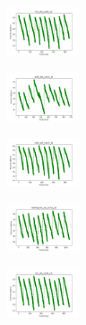 \begin{figure}[H]
    \centering
    \begin{subfigure}
        \centering
        \includegraphics[width=0.234\textwidth]{img/bmb/iris_set_const_10_949004259_cost.png}
    \end{subfigure}
    \hfill
    \begin{subfigure}
        \centering
        \includegraphics[width=0.234\textwidth]{img/bmb/ecoli_set_const_10_949004259_cost.png}
    \end{subfigure}
    \hfill
    \begin{subfigure}
        \centering
        \includegraphics[width=0.234\textwidth]{img/bmb/rand_set_const_10_949004259_cost.png}
    \end{subfigure}
    \hfill
    \begin{subfigure}
        \centering
        \includegraphics[width=0.234\textwidth]{img/bmb/newthyroid_set_const_10_949004259_cost.png}
    \end{subfigure}
    \hfill
    \begin{subfigure}
        \centering
        \includegraphics[width=0.234\textwidth]{img/bmb/iris_set_const_10_589741062_cost.png}
    \end{subfigure}
    \hfill
    \begin{subfigure}

\end{subfigure}
\end{figure}
